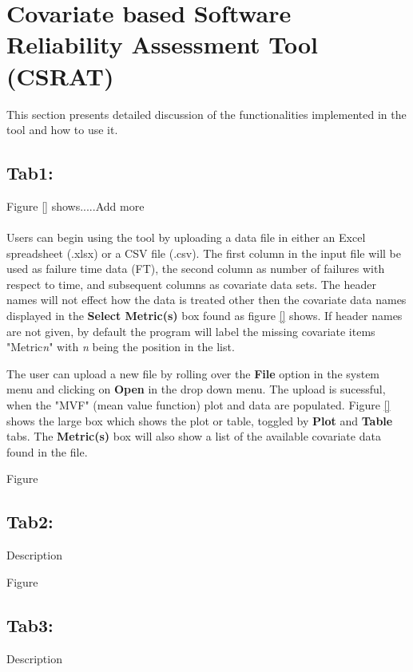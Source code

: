 \documentclass[conference]{IEEEtran}
\begin{document}
\section{Covariate based Software Reliability Assessment Tool (CSRAT)}\label{sec:SRAT}
This section presents detailed discussion of the functionalities implemented in the tool and how to use it.

\subsection{Tab1: }\label{sec:Tab1}
Figure \ref{} shows.....Add more
\\
\\
Users can begin using the tool by uploading a data file in either an Excel spreadsheet (.xlsx) or a CSV file (.csv). The first column in the input file will be used as failure time data (FT), the second column as number of failures with respect to time, and subsequent columns as covariate data sets. The header names will not effect how the data is treated other then the covariate data names displayed in the \textbf{Select Metric(s)} box found as figure \ref{} shows. If header names are not given, by default the program will label the missing covariate items "Metric\textit{n}" with \textit{n} being the position in the list.


The user can upload a new file by rolling over the \textbf{File} option in the system menu and clicking on \textbf{Open} in the drop down menu. The upload is sucessful, when the "MVF" (mean value function) plot and data are populated. Figure \ref{} shows the large box which shows the plot or table, toggled by \textbf{Plot} and \textbf{Table} tabs. The \textbf{Metric(s)} box will also show a list of the available covariate data found in the file. 

Figure 



\subsection{Tab2: }\label{sec:Tab2}
Description

Figure 

\subsection{Tab3: }\label{sec:Tab3}
Description
\end{document}
